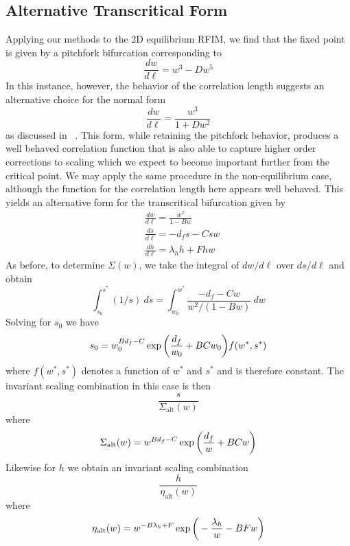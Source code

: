\documentclass[reprint,amsmath,amssymb,aps,floatfix]{revtex4-1}
\begin{document}
\subsection{\label{app:well-behaved} Alternative Transcritical Form}
Applying our methods to the 2D equilibrium RFIM, we find that the fixed point is given by a pitchfork bifurcation corresponding to
%
\begin{equation}
\frac{dw}{d\ell}= w^3-D w^5
\end{equation} 
%
In this instance, however, the behavior of the correlation length suggests an alternative choice for the normal form 
%
\begin{equation}
\frac{dw}{d\ell}= \frac{w^3}{1+D w^2}
\end{equation}
% 
as discussed in ~\cite{Raju17}. This form, while retaining the pitchfork behavior, produces a well behaved correlation function that is also able to capture higher order corrections to scaling which we expect to become important further from the critical point. We may apply the same procedure in the non-equilibrium case, although the function for the correlation length here appears well behaved. This yields an alternative form for the transcritical bifurcation given by
%
\begin{equation}
	\begin{split}
		&\frac{dw}{d\ell}= \frac{w^2}{1-B w}\\
		&\frac{ds}{d\ell}= -d_f s-C s w\\
		&\frac{dh}{d\ell}= \lambda_h h+F h w
		\end{split}
\end{equation}
%
As before, to determine $\Sigma(w)$, we take the integral of $dw/d\ell$ over $ds/d\ell$ and obtain
%
\begin{equation}
	\int_{s_0}^{s^*}(1/s)\ ds = \int_{w_0}^{w^*}\frac{-d_f-Cw}{w^2/(1- B w)}\ dw
\end{equation}
%
\noindent Solving for $s_0$ we have
%
\begin{equation}
	s_0 =w_0^{B d_f -C} \exp \bigg{(}\frac{d_f}{w_0}+B C w_0\bigg{)}f(w^*, s^*)
\end{equation} 
%
\noindent where $f(w^*, s^*)$ denotes a function of $w^*$ and $s^*$ and is therefore constant. The invariant scaling combination in this case is then
%
\begin{equation}
	\frac{s}{\Sigma_{\textrm{alt}}(w)}
\end{equation}
%
\noindent where
%
\begin{equation}
	\Sigma_{\textrm{alt}}(w) = w^{B d_f -C}\exp \bigg{(}\frac{d_f}{w}+B C w\bigg{)}
\end{equation}
%
\noindent Likewise for $h$ we obtain an invariant scaling combination
%
\begin{equation}
	\frac{h}{\eta_{\textrm{alt}}(w)}
\end{equation}
%
\noindent where
%
\begin{equation}
	\eta_{\textrm{alt}}(w) = w^{-B \lambda_h + F}\exp \bigg{(}-\frac{\lambda_h}{w}-B F w\bigg{)}
\end{equation}
%
\end{document}
